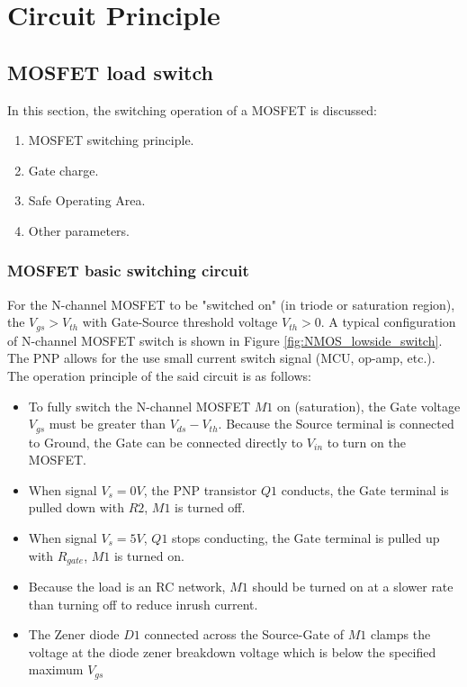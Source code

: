 \documentclass[main.tex]{subfiles}
\begin{document}
    \chapter{Circuit Principle}

    \section{MOSFET load switch}
    \justify
    In this section, the switching operation of a MOSFET is discussed:
    \begin{enumerate}
        \item MOSFET switching principle.
        \item Gate charge.
        \item Safe Operating Area.
        \item Other parameters.
    \end{enumerate}

    \pagebreak
    \subsection{MOSFET basic switching circuit}

    \justify
    For the N-channel MOSFET to be  "switched on" (in triode or saturation region), the $V_{gs} > V_{th}$ with Gate-Source threshold voltage $V_{th} > 0$. A typical configuration of N-channel MOSFET switch is shown in Figure \ref{fig:NMOS_lowside_switch}. The PNP allows for the use small current switch signal (MCU, op-amp, etc.). The operation principle of the said circuit is as follows:

    \begin{itemize}
        \item To fully switch the N-channel MOSFET $M1$ on (saturation), the Gate voltage $V_{gs}$ must be greater than $V_{ds}-V_{th}$. Because the Source terminal is connected to Ground, the Gate can be connected directly to $V_{in}$ to turn on the MOSFET.
        \item When signal $V_s=0V$, the PNP transistor $Q1$ conducts, the Gate terminal is pulled down with $R2$, $M1$ is turned off. 
        \item When signal $V_s=5V$, $Q1$ stops conducting, the Gate terminal is pulled up with $R_{gate}$, $M1$ is turned on. 
        \item Because the load is an RC network, $M1$ should be turned on at a slower rate than turning off to reduce inrush current.
        \item The Zener diode $D1$ connected across the Source-Gate of $M1$ clamps the voltage at the diode zener breakdown voltage which is below the specified maximum $V_{gs}$

    \end{itemize}
\end{document}
